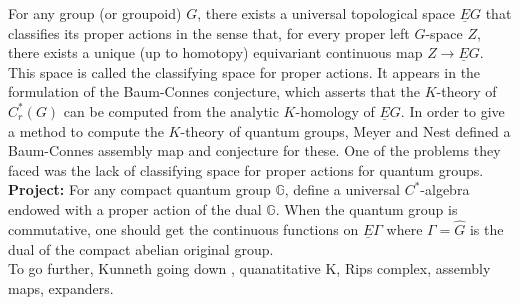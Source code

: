 For any group (or groupoid) $G$, there exists a universal topological space $\underline E G$ that classifies its proper actions in the sense that, for every proper left $G$-space $Z$, there exists a unique (up to homotopy) equivariant continuous map $Z \rightarrow \underline E G$. This space is called the classifying space for proper actions. It appears in the formulation of the Baum-Connes conjecture, which asserts that the $K$-theory of $C^*_r(G)$ can be computed from the analytic $K$-homology of $\underline E G$. In order to give a method to compute the $K$-theory of quantum groups, Meyer and Nest defined a Baum-Connes assembly map and conjecture for these. One of the problems they faced was the lack of classifying space for proper actions for quantum groups. \\

\textbf{Project:} For any compact quantum group $\mathbb G$, define a universal $C^*$-algebra endowed with a proper action of the dual $\hat {\mathbb G}$. When the quantum group is commutative, one should get the continuous functions on $\underline E \Gamma$ where $\Gamma= \hat G$ is the dual of the compact abelian original group.\\

To go further, Kunneth going down , quanatitative K, Rips complex, assembly maps, expanders.





      
